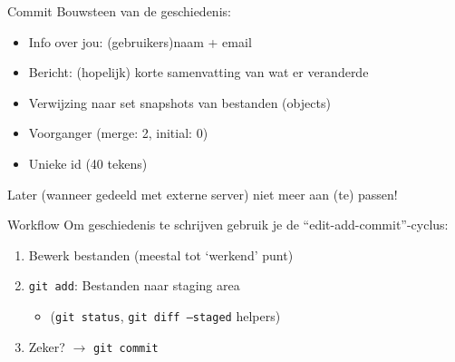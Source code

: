\begin{frame}{Commit}
	Bouwsteen van de geschiedenis:
	\begin{itemize}
		\item Info over jou: (gebruikers)naam + email
		\item Bericht: (hopelijk) korte samenvatting van wat er veranderde
		\item Verwijzing naar set snapshots van bestanden (objects)
		\item Voorganger (merge: 2, initial: 0)
		\item Unieke id (40 tekens)
	\end{itemize}
	\alert{Later (wanneer gedeeld met externe server) niet meer aan (te) passen!}
\end{frame}

\begin{frame}{Workflow}
	Om geschiedenis te schrijven gebruik je de ``edit-add-commit''-cyclus:
	\begin{enumerate}
		\item Bewerk bestanden (meestal tot `werkend' punt)
		\item \texttt{git add}: Bestanden naar staging area
		\begin{itemize}
			\item (\texttt{git status}, \texttt{git diff --staged} helpers)
		\end{itemize}
		\item Zeker? $\rightarrow$ \texttt{git commit}
	\end{enumerate}
\end{frame}
